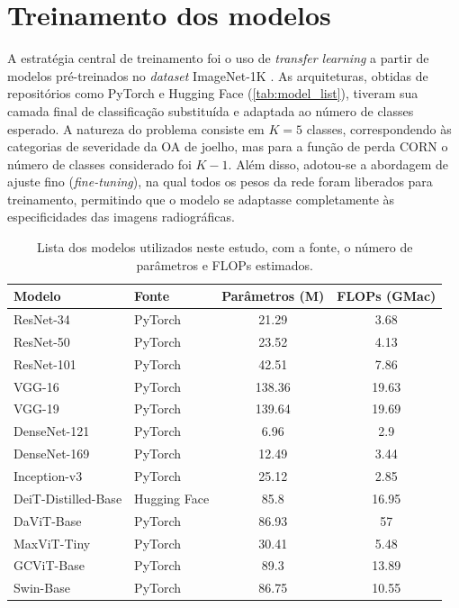 \section{Treinamento dos modelos}

A estratégia central de treinamento foi o uso de \textit{transfer learning} a partir de modelos pré-treinados no \textit{dataset} ImageNet-1K \citep{Russakovsky2015}. As arquiteturas, obtidas de repositórios como PyTorch e Hugging Face (\autoref{tab:model_list}), tiveram sua camada final de classificação substituída e adaptada ao número de classes esperado. A natureza do problema consiste em $K=5$ classes, correspondendo às categorias de severidade da OA de joelho, mas para a função de perda CORN o número de classes considerado foi $K-1$. Além disso, adotou-se a abordagem de ajuste fino (\textit{fine-tuning}), na qual todos os pesos da rede foram liberados para treinamento, permitindo que o modelo se adaptasse completamente às especificidades das imagens radiográficas.

\begin{table}[ht]
    \centering
    \begin{tabular}{llcc}
        \toprule
        \textbf{Modelo} & \textbf{Fonte} & \textbf{Parâmetros (M)} & \textbf{FLOPs (GMac)} \\
        \midrule
        ResNet-34 & PyTorch & 21.29 & 3.68 \\
        ResNet-50 & PyTorch & 23.52 & 4.13 \\
        ResNet-101 & PyTorch & 42.51 & 7.86 \\
        VGG-16 & PyTorch & 138.36 & 19.63 \\
        VGG-19 & PyTorch & 139.64 & 19.69 \\
        DenseNet-121 & PyTorch & 6.96 & 2.9 \\
        DenseNet-169 & PyTorch & 12.49 & 3.44 \\
        Inception-v3 & PyTorch & 25.12 & 2.85 \\
        DeiT-Distilled-Base & Hugging Face & 85.8 & 16.95 \\
        DaViT-Base & PyTorch & 86.93 & 57 \\
        MaxViT-Tiny & PyTorch & 30.41 & 5.48 \\
        GCViT-Base & PyTorch & 89.3 & 13.89 \\
        Swin-Base & PyTorch & 86.75 & 10.55 \\
        \bottomrule
    \end{tabular}
    \caption{Lista dos modelos utilizados neste estudo, com a fonte, o número de parâmetros e FLOPs estimados.}
    \label{tab:model_list}
\end{table}

